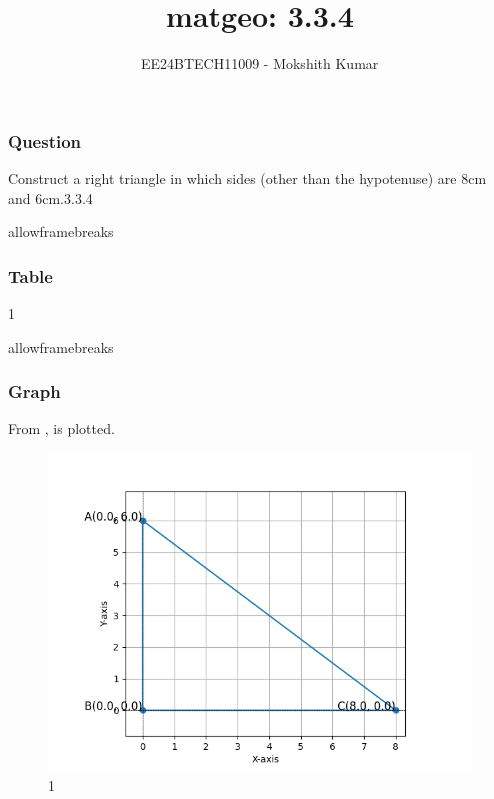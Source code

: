 \documentclass{beamer}
\begin{document}
\title{matgeo: 3.3.4}
\author{EE24BTECH11009 - Mokshith Kumar$^{}$%
}
\frame{\titlepage}
\begin{frame}
\frametitle{Question}
Construct a right triangle in which sides (other than the hypotenuse) are $8$cm and $6$cm.\hfill{3.3.4}
\end{frame}
\begin{frame}{allowframebreaks}
\frametitle{Table}
\begin{table}[h]
    \centering
    
    \caption{1}
    \label{table}
\end{table}
\end{frame}
\begin{frame}{allowframebreaks}
\frametitle{Graph}
From , is plotted.
\begin{figure}[h!]
   \centering
   \includegraphics[width=0.7\linewidth]{figs/plot.png}
   \caption{1 }
   \label{stemplot}
\end{figure}\\
\end{frame}
\end{document}
